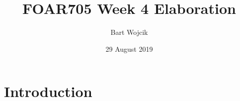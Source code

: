 \documentclass{article}
\title{FOAR705 Week 4 Elaboration}
\author{Bart Wojcik}
\date{29 August 2019}
\begin{document}
\maketitle

\section{Introduction}
\end{document}
